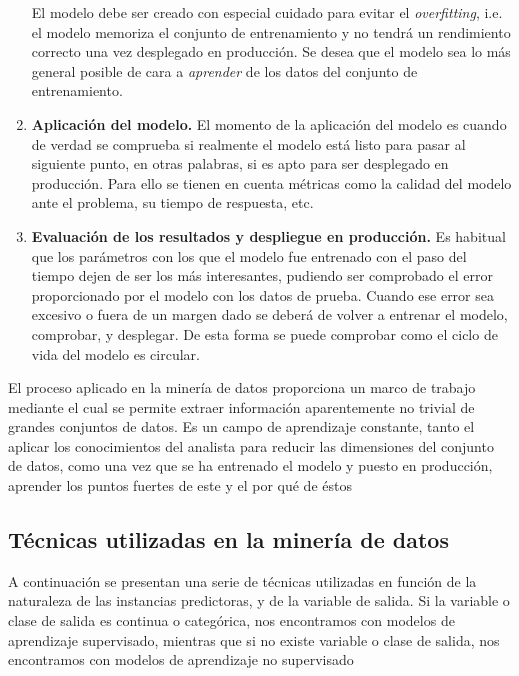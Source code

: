 \begin{enumerate}
    El modelo debe ser creado con especial cuidado para evitar el \textit{overfitting}, i.e. el modelo memoriza el conjunto de entrenamiento y no tendrá un rendimiento correcto una vez desplegado en producción. Se desea que el modelo sea lo más general posible de cara a \textit{aprender} de los datos del conjunto de entrenamiento.

    \item \textbf{Aplicación del modelo.}
	El momento de la aplicación del modelo es cuando de verdad se comprueba si realmente el modelo está listo para pasar al siguiente punto, en otras palabras, si es apto para ser desplegado en producción. 
	Para ello se tienen en cuenta métricas como la calidad del modelo ante el problema, su tiempo de respuesta, etc.
    
	\item \textbf{Evaluación de los resultados y despliegue en producción.}
	Es habitual que los parámetros con los que el modelo fue entrenado con el paso del tiempo dejen de ser los más interesantes, pudiendo ser comprobado el error proporcionado por el modelo con los datos de prueba. Cuando ese error sea excesivo o fuera de un margen dado se deberá de volver a entrenar el modelo, comprobar, y desplegar. 
	De esta forma se puede comprobar como el ciclo de vida del modelo es circular.
\end{enumerate}

El proceso aplicado en la minería de datos proporciona un marco de trabajo mediante el cual se permite extraer información aparentemente no trivial de grandes conjuntos de datos. 
Es un campo de aprendizaje constante, tanto el aplicar los conocimientos del analista para reducir las dimensiones del conjunto de datos, como una vez que se ha entrenado el modelo y puesto en producción, aprender los puntos fuertes de este y el por qué de éstos~\cite{Chapman2000CRISPDM1S}

\subsection{Técnicas utilizadas en la minería de datos}

A continuación se presentan una serie de técnicas utilizadas en función de la naturaleza de las instancias predictoras, y de la variable de salida. Si la variable o clase de salida es continua o categórica, nos encontramos con modelos de aprendizaje supervisado, mientras que si no existe variable o clase de salida, nos encontramos con modelos de aprendizaje no supervisado~\cite{palmer2011data}

